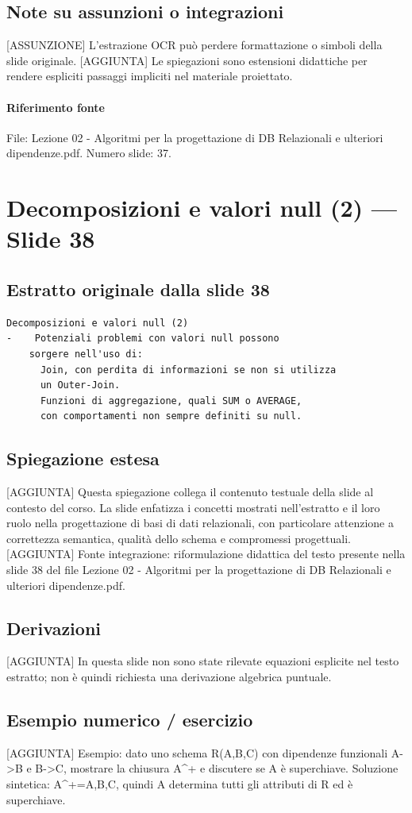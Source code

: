 \documentclass[11pt]{article}
\begin{document}
\subsection*{Note su assunzioni o integrazioni}
[ASSUNZIONE] L'estrazione OCR può perdere formattazione o simboli della slide originale.
[AGGIUNTA] Le spiegazioni sono estensioni didattiche per rendere espliciti passaggi impliciti nel materiale proiettato.
\paragraph{Riferimento fonte} File: Lezione 02 - Algoritmi per la progettazione di DB Relazionali e ulteriori dipendenze.pdf. Numero slide: 37.
\section{Decomposizioni e valori null (2) --- Slide 38}
\subsection*{Estratto originale dalla slide 38}
\begin{lstlisting}
Decomposizioni e valori null (2)
-    Potenziali problemi con valori null possono
    sorgere nell'uso di:
      Join, con perdita di informazioni se non si utilizza
      un Outer-Join.
      Funzioni di aggregazione, quali SUM o AVERAGE,
      con comportamenti non sempre definiti su null.
\end{lstlisting}
\subsection*{Spiegazione estesa}
[AGGIUNTA] Questa spiegazione collega il contenuto testuale della slide al contesto del corso. La slide enfatizza i concetti mostrati nell'estratto e il loro ruolo nella progettazione di basi di dati relazionali, con particolare attenzione a correttezza semantica, qualità dello schema e compromessi progettuali.
[AGGIUNTA] Fonte integrazione: riformulazione didattica del testo presente nella slide 38 del file Lezione 02 - Algoritmi per la progettazione di DB Relazionali e ulteriori dipendenze.pdf.
\subsection*{Derivazioni}
[AGGIUNTA] In questa slide non sono state rilevate equazioni esplicite nel testo estratto; non è quindi richiesta una derivazione algebrica puntuale.
\subsection*{Esempio numerico / esercizio}
[AGGIUNTA] Esempio: dato uno schema R(A,B,C) con dipendenze funzionali A->B e B->C, mostrare la chiusura A^+ e discutere se A è superchiave. Soluzione sintetica: A^+={A,B,C}, quindi A determina tutti gli attributi di R ed è superchiave.
\end{document}
